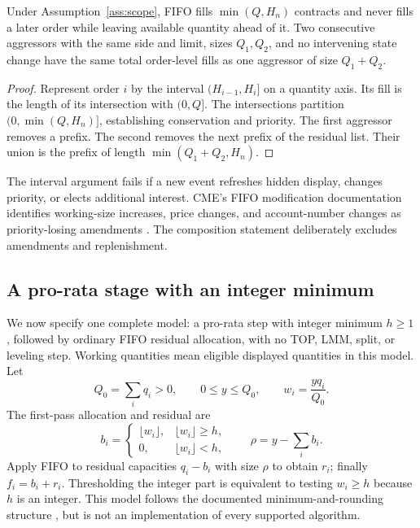 \begin{proposition}\label{prop:fifo}
Under Assumption~\ref{ass:scope}, FIFO fills $\min(Q,H_n)$ contracts and never fills a later order while leaving available quantity ahead of it. Two consecutive aggressors with the same side and limit, sizes $Q_1,Q_2$, and no intervening state change have the same total order-level fills as one aggressor of size $Q_1+Q_2$.
\end{proposition}
\begin{proof}
Represent order $i$ by the interval $(H_{i-1},H_i]$ on a quantity axis. Its fill is the length of its intersection with $(0,Q]$. The intersections partition $(0,\min(Q,H_n)]$, establishing conservation and priority. The first aggressor removes a prefix. The second removes the next prefix of the residual list. Their union is the prefix of length $\min(Q_1+Q_2,H_n)$.
\end{proof}

The interval argument fails if a new event refreshes hidden display, changes priority, or elects additional interest. CME's FIFO modification documentation identifies working-size increases, price changes, and account-number changes as priority-losing amendments \citep{CMESteps}. The composition statement deliberately excludes amendments and replenishment.

\subsection{A pro-rata stage with an integer minimum}

We now specify one complete model: a pro-rata step with integer minimum $h\ge1$, followed by ordinary FIFO residual allocation, with no TOP, LMM, split, or leveling step. Working quantities mean eligible displayed quantities in this model. Let
\begin{equation}
 Q_0=\sum_iq_i>0,\qquad 0\le y\le Q_0,\qquad
 w_i=\frac{yq_i}{Q_0}.
\end{equation}
The first-pass allocation and residual are
\begin{equation}
 b_i=\begin{cases}\lfloor w_i\rfloor,&\lfloor w_i\rfloor\ge h,\\
 0,&\lfloor w_i\rfloor<h,
 \end{cases}
 \qquad \rho=y-\sum_i b_i.
\label{eq:prbase}
\end{equation}
Apply FIFO to residual capacities $q_i-b_i$ with size $\rho$ to obtain $r_i$; finally $f_i=b_i+r_i$. Thresholding the integer part is equivalent to testing $w_i\ge h$ because $h$ is an integer. This model follows the documented minimum-and-rounding structure \citep{CMESteps}, but is not an implementation of every supported algorithm.


